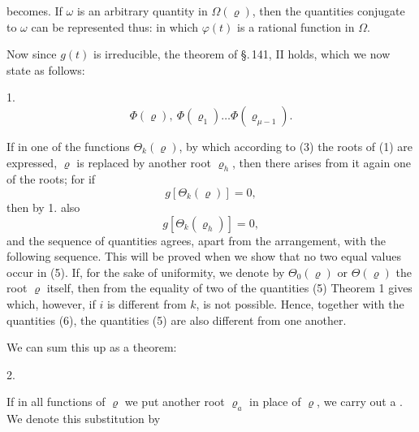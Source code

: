 
becomes. If $\omega$ is an arbitrary quantity in $\Omega(\varrho)$, then the quantities conjugate to $\omega$ can be represented thus:
in which $\varphi(t)$ is a rational function in $\Omega$.

Now since $g(t)$ is irreducible, the theorem of \S.\,141, II holds, which we now state as follows:

1. 
\[
\Phi(\varrho),\ \Phi(\varrho_1) \ldots \Phi(\varrho_{\mu-1}).
\]

If in one of the functions $\Theta_k(\varrho)$, by which according to (3) the roots of (1) are expressed, $\varrho$ is replaced by another root $\varrho_h$, then there arises from it again one of the roots; for if
\[
g[\Theta_k(\varrho)] = 0,
\]
then by 1. also
\[
g[\Theta_k(\varrho_h)] = 0,
\]
and the sequence of quantities
agrees, apart from the arrangement, with the following sequence.
This will be proved when we show that no two equal values occur in (5). If, for the sake of uniformity, we denote by $\Theta_0(\varrho)$ or $\Theta(\varrho)$ the root $\varrho$ itself, then from the equality of two of the quantities (5)
Theorem 1 gives
which, however, if $i$ is different from $k$, is not possible. Hence, together with the quantities (6), the quantities (5) are also different from one another.

We can sum this up as a theorem:

2. 

If in all functions of $\varrho$ we put another root $\varrho_a$ in place of $\varrho$, we carry out a . We denote this substitution by
